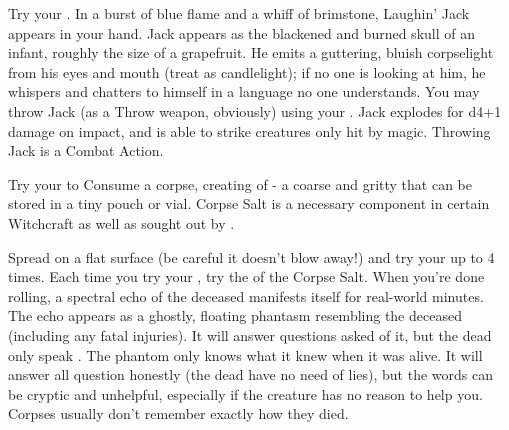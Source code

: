 

\NECRO[
  Name=Laughin' Jack,
  Link=witchcraft-laughin-jack
]

Try your \JUJU. In a burst of blue flame and a whiff of brimstone, Laughin' Jack appears in your hand.  Jack appears as the blackened and burned skull of an infant, roughly the size of a grapefruit.  He emits a guttering, bluish corpselight from his eyes and mouth (treat as candlelight); if no one is looking at him, he whispers and chatters to himself in a language no one understands.  You may throw Jack (as a Throw weapon, obviously) using your \FOC.  Jack explodes for d4+1 damage on impact, and is able to strike creatures only hit by magic.  Throwing Jack is a Combat Action.




\NECRO[
  Name=Corpse Salt,
  Link=witchcraft-corpse-salt
]

Try your \JUJU to Consume a corpse, creating  of  - a coarse and gritty  that can be stored in a tiny pouch or vial.  Corpse Salt is a necessary component in certain Witchcraft as well as sought out by .


\NECRO[
  Name=Corpse Tongue,
  Link=witchcraft-corpse-tongue
]

Spread  on a flat surface (be careful it doesn't blow away!) and try your \JUJU up to 4 times. Each time you try your \JUJU, try the \UD of the Corpse Salt. When you're done rolling, a spectral echo of the deceased manifests itself for \SUMDICE real-world minutes. The echo appears as a ghostly, floating phantasm resembling the deceased (including any fatal injuries). It will answer questions asked of it, but the dead only speak . The phantom only knows what it knew when it was alive. It will answer all question honestly (the dead have no need of lies), but the words can be cryptic and unhelpful, especially if the creature has no reason to help you.  Corpses usually don't remember exactly how they died.

